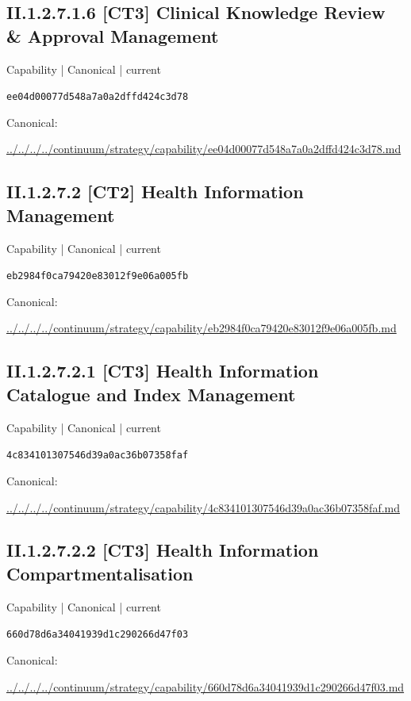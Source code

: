 \documentclass[10pt,a4paper]{article}
\begin{document}
\subsection*{II.1.2.7.1.6 [CT3] Clinical Knowledge Review \& Approval Management}
\label{element-ee04d00077d548a7a0a2dffd424c3d78}
{\small Capability | Canonical | current}\par
\texttt{ee04d00077d548a7a0a2dffd424c3d78}\par
Canonical: \par
{\footnotesize\url{../../../../continuum/strategy/capability/ee04d00077d548a7a0a2dffd424c3d78.md}}\par
\subsection*{II.1.2.7.2 [CT2] Health Information Management}
\label{element-eb2984f0ca79420e83012f9e06a005fb}
{\small Capability | Canonical | current}\par
\texttt{eb2984f0ca79420e83012f9e06a005fb}\par
Canonical: \par
{\footnotesize\url{../../../../continuum/strategy/capability/eb2984f0ca79420e83012f9e06a005fb.md}}\par
\subsection*{II.1.2.7.2.1 [CT3] Health Information Catalogue and Index Management}
\label{element-4c834101307546d39a0ac36b07358faf}
{\small Capability | Canonical | current}\par
\texttt{4c834101307546d39a0ac36b07358faf}\par
Canonical: \par
{\footnotesize\url{../../../../continuum/strategy/capability/4c834101307546d39a0ac36b07358faf.md}}\par
\subsection*{II.1.2.7.2.2 [CT3] Health Information Compartmentalisation}
\label{element-660d78d6a34041939d1c290266d47f03}
{\small Capability | Canonical | current}\par
\texttt{660d78d6a34041939d1c290266d47f03}\par
Canonical: \par
{\footnotesize\url{../../../../continuum/strategy/capability/660d78d6a34041939d1c290266d47f03.md}}\par
\end{document}
